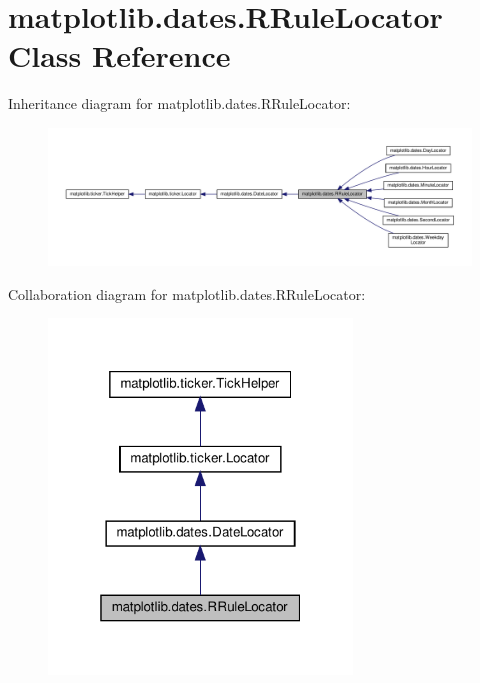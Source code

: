 \hypertarget{classmatplotlib_1_1dates_1_1RRuleLocator}{}\section{matplotlib.\+dates.\+R\+Rule\+Locator Class Reference}
\label{classmatplotlib_1_1dates_1_1RRuleLocator}


Inheritance diagram for matplotlib.\+dates.\+R\+Rule\+Locator\+:
\nopagebreak
\begin{figure}[H]
\begin{center}
\leavevmode
\includegraphics[width=350pt]{classmatplotlib_1_1dates_1_1RRuleLocator__inherit__graph}
\end{center}
\end{figure}


Collaboration diagram for matplotlib.\+dates.\+R\+Rule\+Locator\+:
\nopagebreak
\begin{figure}[H]
\begin{center}
\leavevmode
\includegraphics[width=229pt]{classmatplotlib_1_1dates_1_1RRuleLocator__coll__graph}
\end{center}
\end{figure}

